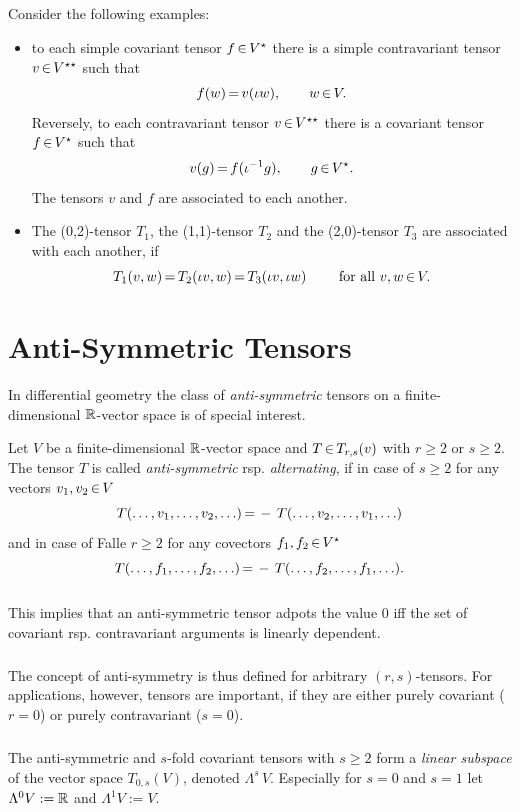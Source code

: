 \documentclass[11pt,twoside]{article}
\begin{document}
\subparagraph{}
Consider the following examples:

\begin{itemize}[leftmargin=15pt]
\item [1.]
to each simple covariant tensor $f {\,\in\,} V^\star$
there is a simple contravariant tensor $v {\,\in\,} V^{\star\star}$
such that
\[
f(w) {\,=\,} v(\iota w), \qquad w {\,\in\,} V.
\]
Reversely,
to each contravariant tensor $v {\,\in\,} V^{\star\star}$ 
there is a covariant tensor $f {\,\in\,} V^\star$
such that
\[
v(g) {\,=\,} f(\iota^{-1} g), \qquad g {\,\in\,} V^\star.
\]
The tensors $v$ and $f$ are associated to each another.

\item [2.]
The (0,2)-tensor $T_1$, the (1,1)-tensor $T_2$ and the (2,0)-tensor $T_3$
are associated with each another,
if
\[
T_1(v,w) {\,=\,} T_2(\iota v, w) {\,=\,} T_3(\iota v, \iota w) \qquad
\mbox{ for all } v,w {\,\in\,} V.
\]
\end{itemize}

\section{Anti-Symmetric Tensors}
In differential geometry the class of \textit{anti-symmetric}
tensors on a finite-dimensional ${\mathbb{R}}$-vector space is of special interest.

\begin{definition}
Let $V$ be a finite-dimensional ${\mathbb{R}}$-vector space and
$T {\,\in\,} T_{r,s}(v)$ with $r \geq 2$ or $s \geq 2$. 
The tensor $T$ is called \textit{anti-symmetric} rsp. \textit{alternating},
if in case of $s \geq 2$ for any vectors $v_1,v_2 {\,\in\,} V$
\[
T(\ldots,v_1,\ldots,v_2,\ldots) {\,=\,} - \, T(\ldots,v_2,\ldots,v_1,\ldots)
\]
and in case of Falle $r \geq 2$ for any covectors $f_1, f_2 {\,\in\,} V^\star$
\[
T(\ldots,f_1,\ldots,f_2,\ldots) {\,=\,} - \, T(\ldots,f_2,\ldots,f_1,\ldots).
\]
\end{definition}

\subparagraph{}
This implies
that an anti-symmetric tensor adpots the value $0$
iff
the set of covariant rsp. contravariant arguments is linearly dependent.

\subparagraph{}
The concept of anti-symmetry is thus defined for arbitrary $(r,s)$-tensors.
For applications,
however,
tensors are important,
if they are either purely covariant ($r=0$) or purely contravariant ($s=0$).

\subparagraph{}
The anti-symmetric and $s$-fold covariant tensors with $s \geq 2$ form
a \textit{linear subspace} of the vector space $T_{0,s}(V)$, 
denoted $\Lambda^s \, V$.
Especially for $s=0$ and $s=1$ let $\Lambda^0 V := {\mathbb{R}}$ and $\Lambda^1 V := V$.
\end{document}
